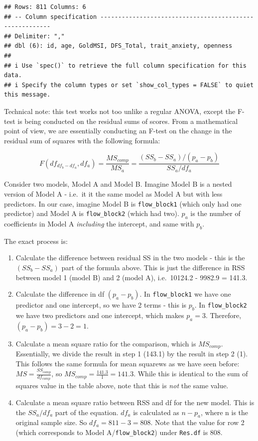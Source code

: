 \documentclass[
]{book}
\begin{document}
\begin{verbatim}
## Rows: 811 Columns: 6
## -- Column specification --------------------------------------------------------
## Delimiter: ","
## dbl (6): id, age, GoldMSI, DFS_Total, trait_anxiety, openness
## 
## i Use `spec()` to retrieve the full column specification for this data.
## i Specify the column types or set `show_col_types = FALSE` to quiet this message.
\end{verbatim}

Technical note: this test works not too unlike a regular ANOVA, except the F-test is being conducted on the residual sums of scores. From a mathematical point of view, we are essentially conducting an F-test on the change in the residual sum of squares with the following formula:

\[
F(df_{df_b - df_a}, df_a) = \frac{MS_{comp}}{MS_{a}} = \frac{(SS_b - SS_a)/(p_a - p_b)}{SS_a/df_a}
\]

Consider two models, Model A and Model B. Imagine Model B is a nested version of Model A - i.e.~it it the same model as Model A but with less predictors. In our case, imagine Model B is \texttt{flow\_block1} (which only had one predictor) and Model A is \texttt{flow\_block2} (which had two). \(p_a\) is the number of coefficients in Model A \emph{including} the intercept, and same with \(p_b\).

The exact process is:

\begin{enumerate}
\def\labelenumi{\arabic{enumi}.}
\item
  Calculate the difference between residual SS in the two models - this is the \((SS_b - SS_a)\) part of the formula above. This is just the difference in RSS between model 1 (model B) and 2 (model A), i.e.~10124.2 - 9982.9 = 141.3.
\item
  Calculate the difference in df \((p_a - p_b)\). In \texttt{flow\_block1} we have one predictor and one intercept, so we have 2 terms - this is \(p_b\). In \texttt{flow\_block2} we have two predictors and one intercept, which makes \(p_a = 3\). Therefore, \((p_a - p_b) = 3 - 2 = 1\).
\item
  Calculate a mean square ratio for the comparison, which is \(MS_{comp}\). Essentially, we divide the result in step 1 (143.1) by the result in step 2 (1). This follows the same formula for mean squarews as we have seen before: \(MS = \frac{SS_{comp}}{df_{comp}}\), so
  \(MS_{comp} = \frac{141.3}{1} = 141.3.\) While this is identical to the sum of squares value in the table above, note that this is \emph{not} the same value.
\item
  Calculate a mean square ratio between RSS and df for the new model. This is the \(SS_a/df_a\) part of the equation. \(df_a\) is calculated as \(n - p_a\), where n is the original sample size. So \(df_a = 811 - 3 = 808\). Note that the value for row 2 (which corresponds to Model A/\texttt{flow\_block2}) under \texttt{Res.df} is 808.
\end{enumerate}
\end{document}
